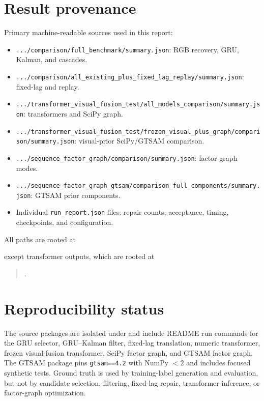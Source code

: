 \documentclass[11pt]{article}
\begin{document}
\appendix
\small
\section{Result provenance}

Primary machine-readable sources used in this report:
\begin{itemize}
\item \texttt{.../comparison/full\_benchmark/summary.json}: RGB recovery, GRU, Kalman, and cascades.
\item \texttt{.../comparison/all\_existing\_plus\_fixed\_lag\_replay/summary.json}: fixed-lag and replay.
\item \texttt{.../transformer\_visual\_fusion\_test/all\_models\_comparison/summary.json}: transformers and SciPy graph.
\item \texttt{.../transformer\_visual\_fusion\_test/frozen\_visual\_plus\_graph/comparison/summary.json}: visual-prior SciPy/GTSAM comparison.
\item \texttt{.../sequence\_factor\_graph/comparison/summary.json}: factor-graph modes.
\item \texttt{.../sequence\_factor\_graph\_gtsam/comparison\_full\_components/summary.json}: GTSAM prior components.
\item Individual \texttt{run\_report.json} files: repair counts, acceptance, timing, checkpoints, and configuration.
\end{itemize}

All paths are rooted at
\begin{quote}
\end{quote}
except transformer outputs, which are rooted at
\begin{quote}
.
\end{quote}

\section{Reproducibility status}

The source packages are isolated under
 and include README run commands for the GRU selector, GRU--Kalman filter, fixed-lag translation, numeric transformer, frozen visual-fusion transformer, SciPy factor graph, and GTSAM factor graph.  The GTSAM package pins \texttt{gtsam==4.2} with NumPy $<2$ and includes focused synthetic tests.  Ground truth is used by training-label generation and evaluation, but not by candidate selection, filtering, fixed-lag repair, transformer inference, or factor-graph optimization.
\end{document}

